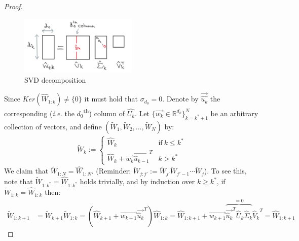 \documentclass[12pt]{article}
\newcommand{\ie}{{\it i.e. }}
\begin{document}
\begin{proof}
	    \newline
	    \begin{figure}[ht!]
    		\vspace{1mm}
    		\centering
    		\includegraphics[width=0.5\textwidth]{figs/svd}
    		\caption{
    			SVD decomposition
    		}
    		\label{fig:svd}
	    \end{figure}
	    \newline
	    Since $Ker({{\widehat{W}_{1:k}}}) \neq \{0\}$ it must hold that $\sigma_{d_0} = 0$. Denote by $\overrightarrow{\widehat{u_k}}$ the corresponding (\ie the $d_0$\textsuperscript{th}) column of $\widehat{U_k}$. Let $\{\overrightarrow{w_k} \in {\mathbb{R}^{d_k}}\}_{k = k^\ast + 1} ^ N$ be an arbitrary collection of vectors, and define $({\widetilde{W}_1}, {\widetilde{W}_2}, ... , {\widetilde{W}_N})$ by:
	    \begin{align*}
	        {\widetilde{W}_k}:=
	            \begin{cases}
	                    {\widehat{W}_k} & \text{if}\ k \leq k^\ast \\
	                    {\widehat{W}_k} + \overrightarrow{w_k}\overrightarrow{{\widehat{u}_{k-1}}}^T & k > k^\ast
	            \end{cases}
	    \end{align*}
	    We claim that ${{\widetilde{W}_{1:N}}} = {{\widehat{W}_{1:N}}}$. (Reminder: ${\widetilde{W}_{j:j'}} := {\widetilde{W}_{j'}} {\widetilde{W}_{j'-1}} \cdots {\widetilde{W}_j}$). \newline
	    To see this, note that ${\widetilde{W}_{1:k^\ast}} = {\widehat{W}_{1:k^\ast}}$ holds trivially, and by induction over $k \geq k^\ast$, if ${\widetilde{W}_{1:k}} = {\widehat{W}_{1:k}}$ then:
	    \begin{align*}
	        {\widetilde{W}_{1:k+1}} & = {\widetilde{W}_{k+1}} {\widetilde{W}_{1:k}} = ({\widehat{W}_{k+1}} + \overrightarrow{w_{k+1}} \overrightarrow{{\widehat{u}_k}}^T) {{\widehat{W}_{1:k}}} = {\widehat{W}_{1:k+1}} + \overrightarrow{w_{k+1}} 
	        \overbrace{\overrightarrow{{\widehat{u}_k}}^T {\widehat{U}_k} {\widehat{\Sigma}_k}}^{=0} {\widehat{V}_k}^T = {\widehat{W}_{1:k+1}}

\end{align*}
\end{proof}
\end{document}
